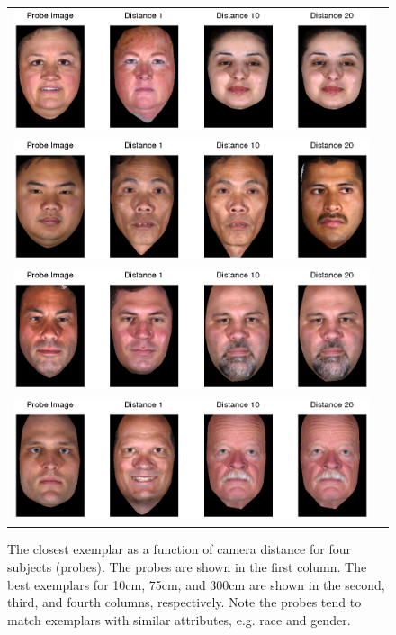 \documentclass[runningheads]{llncs}
\begin{document}
\begin{figure}[ht!]
\centering
\begin{tabular}{cc}
\includegraphics[width=1\linewidth]{resources/figures/best_exemplar1.png} \\
\includegraphics[width=1\linewidth]{resources/figures/best_exemplar3.png} \\
\includegraphics[width=1\linewidth]{resources/figures/best_exemplar10.png} \\
\includegraphics[width=1\linewidth]{resources/figures/best_exemplar26.png}
\end{tabular}
\caption{
The closest exemplar as a function of camera distance for four subjects (probes).
The probes are shown in the first column.
The best exemplars for 10cm, 75cm, and 300cm are shown in the second, third, and fourth columns, respectively.
Note the probes tend to match exemplars with similar attributes, e.g. race and gender.
}
\label{fig:bestexemplar}
\end{figure}
\end{document}
